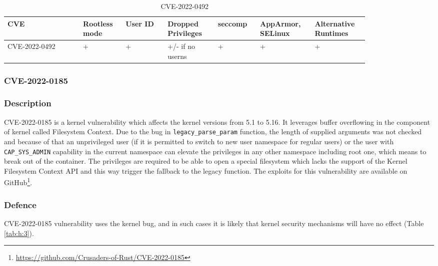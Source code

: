 \begin{table}[H]
    \centering \small
    \begin{tabular}{| p{0.18\linewidth} | p{0.1\linewidth} | p{0.1\linewidth} | p{0.12\linewidth} | p{0.1\linewidth} | p{0.12\linewidth} | p{0.12\linewidth} |} \hline
    CVE & Rootless mode & User ID & Dropped Privileges & seccomp & AppArmor, SELinux & Alternative Runtimes \\ \hline
    CVE-2022-0492 & \cellcolor{green!25} + & \cellcolor{green!25} + & \cellcolor{yellow!25} +/- \linebreak if no userns & \cellcolor{green!25} + & \cellcolor{green!25} + & \cellcolor{green!25} + \\ \hline
    \end{tabular}
    \caption{CVE-2022-0492}
    \label{tab:h:2}
\end{table}

\subsubsection{CVE-2022-0185}
\subsubsection*{Description}

CVE-2022-0185 is a kernel vulnerability which affects the kernel versions from 5.1 to 5.16. It leverages buffer overflowing in the component of kernel called Filesystem Context. Due to the bug in \texttt{legacy\_parse\_param} function, the length of supplied arguments was not checked and because of that an unprivileged user (if it is permitted to switch to new user namespace for regular users) or the user with \texttt{CAP\_SYS\_ADMIN} capability in the current namespace can elevate the privileges in any other namespace including root one, which means to break out of the container. The privileges are required to be able to open a special filesystem which lacks the support of the Kernel Filesystem Context API and this way trigger the fallback to the legacy function. The exploits for this vulnerability are available on GitHub\footnote{\url{https://github.com/Crusaders-of-Rust/CVE-2022-0185}}.

\subsubsection*{Defence}

CVE-2022-0185 vulnerability uses the kernel bug, and in such cases it is likely that kernel security mechanisms will have no effect (Table \ref*{tab:h:3}).

